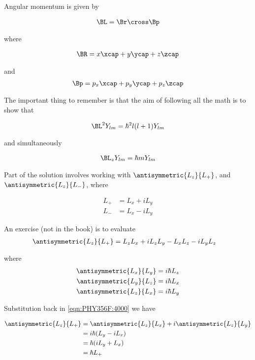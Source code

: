 Angular momentum is given by

\begin{align*}
\BL = \Br \cross \Bp
\end{align*}

where

\begin{align*}
\BR = x \xcap + y\ycap + z\zcap
\end{align*}

and
\begin{align*}
\Bp = p_x \xcap + p_y\ycap + p_z\zcap
\end{align*}

The important thing to remember is that the aim of following all the math is to show that

\begin{align*}
\BL^2 Y_{lm} = \hbar^2 l (l+1) Y_{lm}
\end{align*}

and simultaneously

\begin{align*}
\BL_z Y_{lm} = \hbar m Y_{lm}
\end{align*}

Part of the solution involves working with $\antisymmetric{L_z}{L_{+}}$, and $\antisymmetric{L_z}{L_{-}}$, where

\begin{align*}
L_{+} &= L_x + i L_y \\
L_{-} &= L_x - i L_y
\end{align*}

An exercise (not in the book) is to evaluate
\begin{align}\label{eqn:PHY356F:4000}
\antisymmetric{L_z}{L_{+}}
&= L_z L_x + i L_z L_y - L_x L_z - i L_y L_z
\end{align}

where
\begin{align}\label{eqn:PHY356F:5000}
\antisymmetric{L_x}{L_y}  &= i \hbar L_z \\
\antisymmetric{L_y}{L_z}  &= i \hbar L_x \\
\antisymmetric{L_z}{L_x}  &= i \hbar L_y
\end{align}

Substitution back in \ref{eqn:PHY356F:4000} we have

\begin{align*}
\antisymmetric{L_z}{L_{+}}
&=
\antisymmetric{L_z}{L_x}
+ i \antisymmetric{L_z}{L_y}  \\
&=
i \hbar ( L_y - i L_x ) \\
&=
\hbar ( i L_y +  L_x ) \\
&=
\hbar L_{+}
\end{align*}
